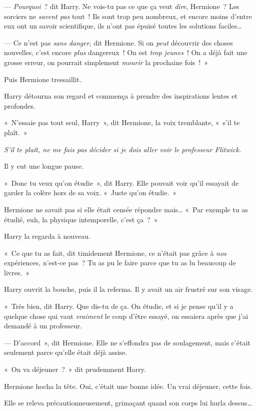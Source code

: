 --- \emph{Pourquoi}~? dit Harry.
Ne vois-tu pas ce que ça veut \emph{dire}, Hermione~?
Les sorciers ne \emph{savent pas} tout~!
Ils sont trop peu nombreux, et encore moins d'entre eux ont un savoir scientifique, ils n'ont pas épuisé toutes les solutions faciles…

--- Ce n'est pas \emph{sans danger}, dit Hermione.
Si on \emph{peut} découvrir des choses nouvelles, c'est encore \emph{plus} dangereux~!
On est \emph{trop jeunes}~!
On a déjà fait une grosse erreur, on pourrait simplement \emph{mourir} la prochaine fois~!~»

Puis Hermione tressaillit.

Harry détourna son regard et commença à prendre des inspirations lentes et profondes.

«~N'essaie pas tout seul, Harry~», dit Hermione, la voix tremblante, «~s'il te plaît.~»

\emph{S'il te plaît, ne me fais pas décider si je dois aller voir le professeur Flitwick.}

Il y eut une longue pause.

«~Donc tu veux qu'on étudie~», dit Harry.
Elle pouvait voir qu'il essayait de garder la colère hors de sa voix.
«~Juste qu'on étudie.~»

Hermione ne savait pas si elle était censée répondre mais…
«~Par exemple tu as étudié, euh, la physique intemporelle, c'est ça~?~»

Harry la regarda à nouveau.

«~Ce que tu as fait, dit timidement Hermione, ce n'était pas grâce à \emph{nos} expériences, n'est-ce pas~?
Tu as pu le faire parce que tu as lu beaucoup de livres.~»

Harry ouvrit la bouche, puis il la referma.
Il y avait un air frustré sur son visage.

«~Très bien, dit Harry.
Que dis-tu de ça.
On étudie, et si je pense qu'il y a quelque chose qui vaut \emph{vraiment} le coup d'être essayé, on essaiera après que j'ai demandé à un professeur.

--- D'accord~», dit Hermione.
Elle ne s'effondra pas de soulagement, mais c'était seulement parce qu'elle était déjà assise.

«~On va déjeuner~?~»
dit prudemment Harry.

Hermione hocha la tête.
Oui, c'était une bonne idée.
Un vrai déjeuner, cette fois.

Elle se releva précautionneusement, grimaçant quand son corps lui hurla dessus…


